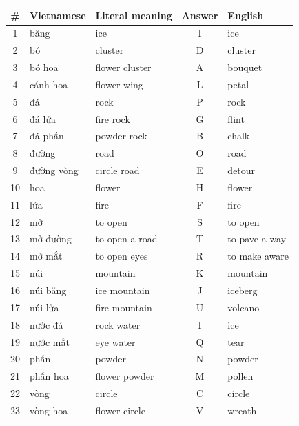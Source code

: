 \documentclass{article}
\begin{document}
\begin{soln}
\begin{otherlanguage}{vietnamese}
    \begin{center}
        \begin{tabular}{|c|l|l|c|l|}
            \hline
            \# & Vietnamese & Literal meaning & Answer & English       \\ \hline
            1  & băng       & ice             & I      & ice           \\ \hline
            2  & bó         & cluster         & D      & cluster       \\ \hline
            3  & bó hoa     & flower cluster  & A      & bouquet       \\ \hline
            4  & cánh hoa   & flower wing     & L      & petal         \\ \hline
            5  & đá         & rock            & P      & rock          \\ \hline
            6  & đá lửa     & fire rock       & G      & flint         \\ \hline
            7  & đá phấn    & powder rock     & B      & chalk         \\ \hline
            8  & đường      & road            & O      & road          \\ \hline
            9  & đường vòng & circle road     & E      & detour        \\ \hline
            10 & hoa        & flower          & H      & flower        \\ \hline
            11 & lửa        & fire            & F      & fire          \\ \hline
            12 & mở         & to open         & S      & to open       \\ \hline
            13 & mở đường   & to open a road  & T      & to pave a way \\ \hline
            14 & mở mắt     & to open eyes    & R      & to make aware \\ \hline
            15 & núi        & mountain        & K      & mountain      \\ \hline
            16 & núi băng   & ice mountain    & J      & iceberg       \\ \hline
            17 & núi lửa    & fire mountain   & U      & volcano       \\ \hline
            18 & nước đá    & rock water      & I      & ice           \\ \hline
            19 & nước mắt   & eye water       & Q      & tear          \\ \hline
            20 & phấn       & powder          & N      & powder        \\ \hline
            21 & phấn hoa   & flower powder   & M      & pollen        \\ \hline
            22 & vòng       & circle          & C      & circle        \\ \hline
            23 & vòng hoa   & flower circle   & V      & wreath        \\ \hline
        \end{tabular}
    \end{center}


\end{otherlanguage}
\end{soln}
\end{document}
